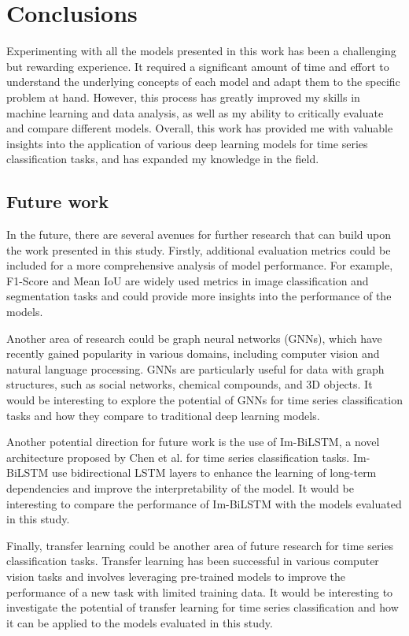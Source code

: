 \chapter{Conclusions}

Experimenting with all the models presented in this work has been a challenging but rewarding experience.
It required a significant amount of time and effort to understand the underlying concepts of each model and adapt them to the specific problem at hand.
However, this process has greatly improved my skills in machine learning and data analysis, as well as my ability to critically evaluate and compare different models.
Overall, this work has provided me with valuable insights into the application of various deep learning models for time series classification tasks, and has expanded my knowledge in the field.

\section{Future work}
In the future, there are several avenues for further research that can build upon the work presented in this study.
Firstly, additional evaluation metrics could be included for a more comprehensive analysis of model performance.
For example, F1-Score and Mean IoU are widely used metrics in image classification and segmentation tasks and could provide more insights into the performance of the models.

Another area of research could be graph neural networks (GNNs), which have recently gained popularity in various domains, including computer vision and natural language processing. 
GNNs are particularly useful for data with graph structures, such as social networks, chemical compounds, and 3D objects. 
It would be interesting to explore the potential of GNNs for time series classification tasks and how they compare to traditional deep learning models.

Another potential direction for future work is the use of Im-BiLSTM, a novel architecture proposed by Chen et al. \cite{CHEN2022102762} for time series classification tasks.
Im-BiLSTM use bidirectional LSTM layers to enhance the learning of long-term dependencies and improve the interpretability of the model. 
It would be interesting to compare the performance of Im-BiLSTM with the models evaluated in this study.

Finally, transfer learning could be another area of future research for time series classification tasks.
Transfer learning has been successful in various computer vision tasks and involves leveraging pre-trained models to improve the performance of a new task with limited training data. 
It would be interesting to investigate the potential of transfer learning for time series classification and how it can be applied to the models evaluated in this study.